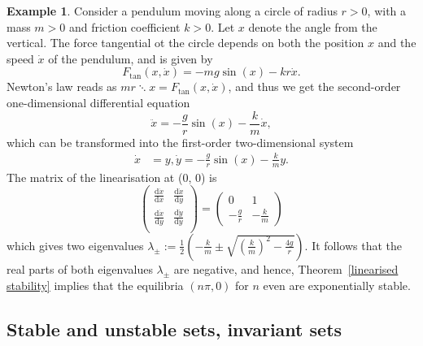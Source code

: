 \documentclass[12pt]{report}
\theoremstyle{definition}
\begin{document}
\newtheorem{pendulum, exponentially stable equilibrium}[theorem]{Example}
\begin{pendulum, exponentially stable equilibrium}
    Consider a pendulum moving along a circle of radius $r>0$, with a mass $m>0$
    and friction coefficient $k>0$. Let $x$ denote the angle from the vertical.
    The force tangential ot the circle depends on both the position $x$ and the
    speed $\dot{x}$ of the pendulum, and is given by
    \[
        F_{\text{tan}}(x,\dot{x})=-mg\sin(x)-kr\dot{x}.
    \]
    Newton's law reads as $mr\ddots{x}=F_{\text{tan}}(x,\dot{x})$, and thus we
    get the second-order one-dimensional differential equation
    \[
        \ddot{x}=-\frac{g}{r}\sin(x)-\frac{k}{m}\dot{x},
    \]
    which can be transformed into the first-order two-dimensional system
    \begin{align*}
        \dot{x} & = y,
        \dot{y} = -\frac{g}{r}\sin(x)-\frac{k}{m}y.
    \end{align*} 
    The matrix of the linearisation at (0, 0) is
    \[
        \begin{pmatrix}
            \frac{\mathrm{d}\dot{x}}{\mathrm{d}x} & \frac{\mathrm{d}\dot{x}}{\mathrm{d}y} \\
            \frac{\mathrm{d}\dot{x}}{\mathrm{d}y} & \frac{\mathrm{d}\dot{y}}{\mathrm{d}y} \\
        \end{pmatrix} =
        \begin{pmatrix}
            0 & 1 \\
            -\frac{g}{r} & -\frac{k}{m}
        \end{pmatrix} 
    \]
    which gives two eigenvalues
    $\lambda_{\pm}:=\frac{1}{2}\left(-\frac{k}{m}\pm\sqrt{{\left(\frac{k}{m}\right)}^{2}-\frac{4g}{r}}\right)$.
    It follows that the real parts of both eigenvalues $\lambda_{\pm}$ are
    negative, and hence, Theorem~\ref{linearised stability} implies that the
    equilibria $(n\pi,0)$ for $n$ even are exponentially stable.
\end{pendulum, exponentially stable equilibrium}

\subsection{Stable and unstable sets, invariant sets}
\end{document}
